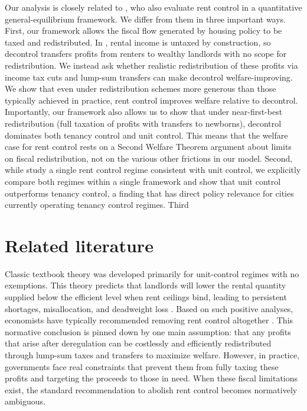 \documentclass[parskip=full]{article}
\begin{document}
Our analysis is closely related to \citet{fmn-2023}, who also evaluate rent control in a quantitative general-equilibrium framework. We differ from them in three important ways. First, our framework allows the fiscal flow generated by housing policy to be taxed and redistributed. In \citet{fmn-2023}, rental income is untaxed by construction, so decontrol transfers profits from renters to wealthy landlords with no scope for redistribution. We instead ask whether realistic redistribution of these profits via income tax cuts and lump-sum transfers can make decontrol welfare-improving. We show that even under redistribution schemes more generous than those typically achieved in practice, rent control improves welfare relative to decontrol. Importantly, our framework also allows us to show that under near-first-best redistribution (full taxation of profits with transfers to newborns), decontrol dominates both tenancy control and unit control. This means that the welfare case for rent control rests on a Second Welfare Theorem argument about limits on fiscal redistribution, not on the various other frictions in our model. Second, while \citet{fmn-2023} study a single rent control regime consistent with unit control, we explicitly compare both regimes within a single framework and show that unit control outperforms tenancy control, a finding that has direct policy relevance for cities currently operating tenancy control regimes. Third

\section{Related literature}\label{sec:related_lit}

Classic textbook theory was developed primarily for unit-control regimes with no exemptions. This theory predicts that landlords will lower the rental quantity supplied below the efficient level when rent ceilings bind, leading to persistent shortages, misallocation, and deadweight loss \citep{suen-1989,gl-2003,diamond-2019}. Based on such positive analyses, economists have typically recommended removing rent control altogether \citep{lindbeck1971,buchanan_1986,friedman_stigler_1946}. This normative conclusion is pinned down by one main assumption: that any profits that arise after deregulation can be costlessly and efficiently redistributed through lump-sum taxes and transfers to maximize welfare. However, in practice, governments face real constraints that prevent them from fully taxing these profits and targeting the proceeds to those in need. When these fiscal limitations exist, the standard recommendation to abolish rent control becomes normatively ambiguous.
\end{document}
